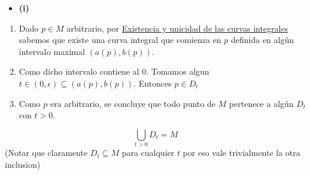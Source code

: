 \begin{bookproof}{}
\begin{itemize}
\item \textbf{(i)}
\end{itemize}
\begin{enumerate}
\item Dado $p\in M$ arbitrario, por \hyperref[blk:3ff110]{Existencia y unicidad de las curvas integrales} sabemos que existe una curva integral que comienza en $p$ definida en algún intervalo maximal $(a(p),b(p))$.
\item Como dicho intervalo contiene al $0$. Tomamos algun $t\in(0,\epsilon)\subseteq (a(p),b(p))$. Entonces $p\in D_t$
\item Como $p$ era arbitrario, se concluye que todo punto de $M$ pertenece a algún $D_t$ con $t>0$.
\end{enumerate}
\[
\bigcup_{t>0}D_t=M
\]
(Notar que claramente $D_{t}\subseteq M$ para cualquier $t$ por eso vale trivialmente la otra inclusion)


\end{bookproof}
